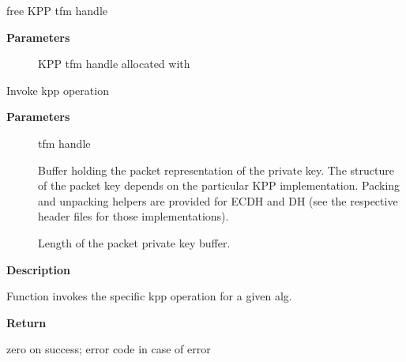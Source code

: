 \documentclass[a4paper,8pt,english]{sphinxmanual}
\begin{document}
\begin{fulllineitems}
\label{crypto/api-kpp:c.crypto_free_kpp}
free KPP tfm handle

\end{fulllineitems}


\textbf{Parameters}
\begin{description}
\item[{}] \leavevmode
KPP tfm handle allocated with {\hyperref[crypto/api\string-kpp:c.crypto_alloc_kpp]{}}

\end{description}

\begin{fulllineitems}
\label{crypto/api-kpp:c.crypto_kpp_set_secret}
Invoke kpp operation

\end{fulllineitems}


\textbf{Parameters}
\begin{description}
\item[{}] \leavevmode
tfm handle

\item[{}] \leavevmode
Buffer holding the packet representation of the private
key. The structure of the packet key depends on the particular
KPP implementation. Packing and unpacking helpers are provided
for ECDH and DH (see the respective header files for those
implementations).

\item[{}] \leavevmode
Length of the packet private key buffer.

\end{description}

\textbf{Description}

Function invokes the specific kpp operation for a given alg.

\textbf{Return}

zero on success; error code in case of error
\end{document}
